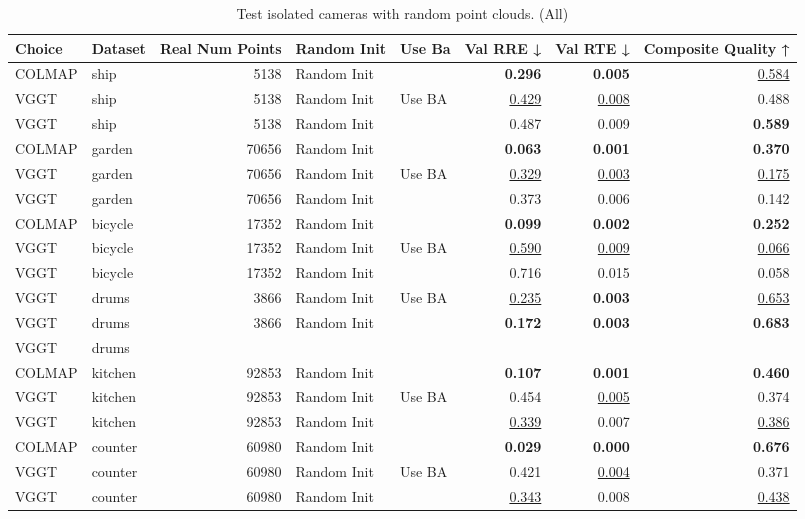 \begin{table}[H]
\caption{Test isolated cameras with random point clouds. (All)}
\label{tab:06_isolated_cams_all}
\small
\begin{tabular}{llrllrrr}
\toprule
Choice & Dataset & Real Num Points & Random Init & Use Ba & Val RRE ↓ & Val RTE ↓ & Composite Quality ↑ \\
\midrule
COLMAP & ship & 5138 & Random Init &  & \textbf{0.296} & \textbf{0.005} & \underline{0.584} \\
VGGT & ship & 5138 & Random Init & Use BA & \underline{0.429} & \underline{0.008} & 0.488 \\
VGGT & ship & 5138 & Random Init &  & 0.487 & 0.009 & \textbf{0.589} \\
\midrule
COLMAP & garden & 70656 & Random Init &  & \textbf{0.063} & \textbf{0.001} & \textbf{0.370} \\
VGGT & garden & 70656 & Random Init & Use BA & \underline{0.329} & \underline{0.003} & \underline{0.175} \\
VGGT & garden & 70656 & Random Init &  & 0.373 & 0.006 & 0.142 \\
\midrule
COLMAP & bicycle & 17352 & Random Init &  & \textbf{0.099} & \textbf{0.002} & \textbf{0.252} \\
VGGT & bicycle & 17352 & Random Init & Use BA & \underline{0.590} & \underline{0.009} & \underline{0.066} \\
VGGT & bicycle & 17352 & Random Init &  & 0.716 & 0.015 & 0.058 \\
\midrule
VGGT & drums & 3866 & Random Init & Use BA & \underline{0.235} & \textbf{0.003} & \underline{0.653} \\
VGGT & drums & 3866 & Random Init &  & \textbf{0.172} & \textbf{0.003} & \textbf{0.683} \\
VGGT & drums &  &  &  &  &  &  \\
\midrule
COLMAP & kitchen & 92853 & Random Init &  & \textbf{0.107} & \textbf{0.001} & \textbf{0.460} \\
VGGT & kitchen & 92853 & Random Init & Use BA & 0.454 & \underline{0.005} & 0.374 \\
VGGT & kitchen & 92853 & Random Init &  & \underline{0.339} & 0.007 & \underline{0.386} \\
\midrule
COLMAP & counter & 60980 & Random Init &  & \textbf{0.029} & \textbf{0.000} & \textbf{0.676} \\
VGGT & counter & 60980 & Random Init & Use BA & 0.421 & \underline{0.004} & 0.371 \\
VGGT & counter & 60980 & Random Init &  & \underline{0.343} & 0.008 & \underline{0.438} \\

\end{tabular}
\end{table}
